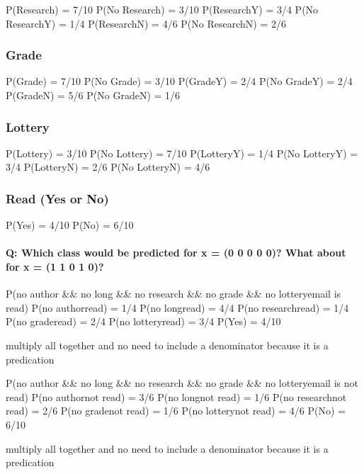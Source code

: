 \documentclass[11pt]{article}
\begin{document}
    P(Research) = 7/10 P(No Research) = 3/10 P(Research\textbar{}Y) = 3/4
P(No Research\textbar{}Y) = 1/4 P(Research\textbar{}N) = 4/6 P(No
Research\textbar{}N) = 2/6

    \subsubsection{Grade}\label{grade}

    P(Grade) = 7/10 P(No Grade) = 3/10 P(Grade\textbar{}Y) = 2/4 P(No
Grade\textbar{}Y) = 2/4 P(Grade\textbar{}N) = 5/6 P(No Grade\textbar{}N)
= 1/6

    \subsubsection{Lottery}\label{lottery}

    P(Lottery) = 3/10 P(No Lottery) = 7/10 P(Lottery\textbar{}Y) = 1/4 P(No
Lottery\textbar{}Y) = 3/4 P(Lottery\textbar{}N) = 2/6 P(No
Lottery\textbar{}N) = 4/6

    \subsubsection{Read (Yes or No)}\label{read-yes-or-no}

    P(Yes) = 4/10 P(No) = 6/10

    \paragraph{Q: Which class would be predicted for x = (0 0 0 0 0)? What
about for x = (1 1 0 1
0)?}\label{q-which-class-would-be-predicted-for-x-0-0-0-0-0-what-about-for-x-1-1-0-1-0}

    P(no author \&\& no long \&\& no research \&\& no grade \&\& no
lottery\textbar{}email is read) P(no author\textbar{}read) = 1/4 P(no
long\textbar{}read) = 4/4 P(no research\textbar{}read) = 1/4 P(no
grade\textbar{}read) = 2/4 P(no lottery\textbar{}read) = 3/4 P(Yes) =
4/10

multiply all together and no need to include a denominator because it is
a predication

P(no author \&\& no long \&\& no research \&\& no grade \&\& no
lottery\textbar{}email is not read) P(no author\textbar{}not read) = 3/6
P(no long\textbar{}not read) = 1/6 P(no research\textbar{}not read) =
2/6 P(no grade\textbar{}not read) = 1/6 P(no lottery\textbar{}not read)
= 4/6 P(No) = 6/10

multiply all together and no need to include a denominator because it is
a predication
\end{document}
